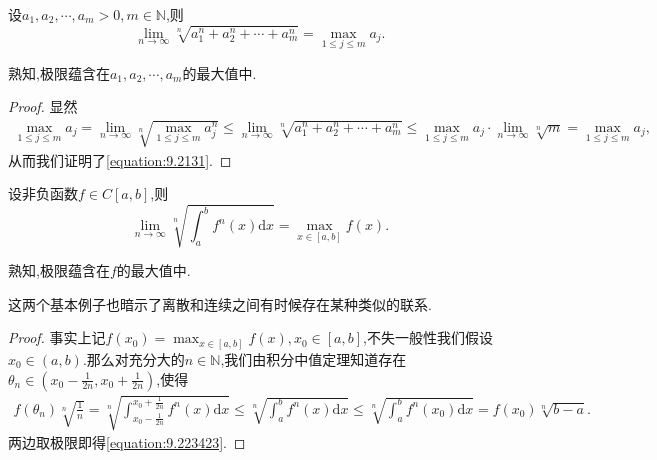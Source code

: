 \documentclass[../../main.tex]{subfiles}
\begin{document}
\begin{example}
设\(a_1,a_2,\cdots,a_m > 0,m \in \mathbb{N}\),则
\[
\lim_{n \to \infty} \sqrt[n]{a_1^n + a_2^n + \cdots + a_m^n} = \max_{1\leqslant  j\leqslant  m} a_j.
\]
\end{example} 
\begin{remark}
熟知,极限蕴含在\(a_1,a_2,\cdots,a_m\)的最大值中.
\end{remark}
\begin{proof}
显然
\begin{align}\label{equation:9.2131}
\max_{1\leqslant  j\leqslant  m} a_j = \lim_{n \to \infty} \sqrt[n]{\max_{1\leqslant  j\leqslant  m} a_j^n} \leqslant  \lim_{n \to \infty} \sqrt[n]{a_1^n + a_2^n + \cdots + a_m^n} \leqslant  \max_{1\leqslant  j\leqslant  m} a_j \cdot \lim_{n \to \infty} \sqrt[n]{m} = \max_{1\leqslant  j\leqslant  m} a_j,
\end{align}
从而我们证明了\eqref{equation:9.2131}.  
\end{proof}

\begin{example}\label{example-3.31}
设非负函数\(f \in C[a,b]\),则
\[
\lim_{n \to \infty} \sqrt[n]{\int_{a}^{b} f^n(x)\mathrm{d}x} = \max_{x\in[a,b]} f(x).
\]
\end{example}
\begin{remark}
熟知,极限蕴含在\(f\)的最大值中. 
\end{remark}
\begin{note}
这两个基本例子也暗示了离散和连续之间有时候存在某种类似的联系.
\end{note}
\begin{proof}
事实上记\(f(x_0) = \max_{x\in[a,b]} f(x), x_0 \in [a,b]\),不失一般性我们假设\(x_0 \in (a,b)\).那么对充分大的\(n \in \mathbb{N}\),我们由积分中值定理知道存在\(\theta_n \in (x_0 - \frac{1}{2n}, x_0 + \frac{1}{2n})\),使得
\begin{align}\label{equation:9.223423}
f(\theta_n) \sqrt[n]{\frac{1}{n}} = \sqrt[n]{\int_{x_0 - \frac{1}{2n}}^{x_0 + \frac{1}{2n}} f^n(x)\mathrm{d}x} \leqslant  \sqrt[n]{\int_{a}^{b} f^n(x)\mathrm{d}x} \leqslant  \sqrt[n]{\int_{a}^{b} f^n(x_0)\mathrm{d}x} = f(x_0) \sqrt[n]{b - a}.   
\end{align}
两边取极限即得\eqref{equation:9.223423}.
\end{proof}
\end{document}
